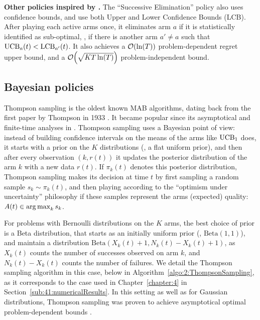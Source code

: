 \textbf{Other policies inspired by \UCB.}
%
The ``Successive Elimination'' policy also uses confidence bounds, and use both Upper and Lower Confidence Bounds (LCB).
After playing each active arms once, it eliminates arm $a$ if it is statistically identified as sub-optimal, \ie, if there is another arm $a' \neq a$ such that $\mathrm{UCB}_a(t) < \mathrm{LCB}_{a'}(t)$.
It also achieves a $\mathop{}\mathopen{}\mathcal{O}\mathopen{}\left(\ln(T)\right)$ problem-dependent regret upper bound, and a $\mathop{}\mathopen{}\mathcal{O}\mathopen{}\left(\sqrt{K T \ln(T)}\right)$ problem-independent bound.


\subsection{Bayesian policies}



Thompson sampling is the oldest known MAB algorithms, dating back from the first paper by Thompson in 1933 \cite{Thompson33}.
It became popular since its asymptotical and finite-time analyses in \cite{AgrawalGoyal11,Kaufmann12Thompson}.
%
Thompson sampling uses a Bayesian point of view:
instead of building confidence intervals on the means of the arms like $\mathrm{UCB}_1$ does,
it starts with a prior on the $K$ distributions (\eg, a flat uniform prior), and then after every observation $(k, r(t))$ it updates the posterior distribution of the arm $k$ with a new data $r(t)$.
If $\pi_k(t)$ denotes this posterior distribution, Thompson sampling makes its decision at time $t$ by first sampling a random sample $s_k \sim \pi_k(t)$, and then playing according to the ``optimism under uncertainty'' philosophy if these samples represent the arms (expected) quality: $A(t) \in \operatorname*{arg\,max}_k s_k$.

For problems with Bernoulli distributions on the $K$ arms,
the best choice of prior is a Beta distribution, that starts as an initially uniform prior (\ie, $\mathrm{Beta}(1,1)$),
and maintain a distribution $\mathrm{Beta}(X_k(t)+1,N_k(t)-X_k(t)+1)$,
as $X_k(t)$ counts the number of successes observed on arm $k$, and $N_k(t)-X_k(t)$ counts the number of failures.
%
We detail the Thompson sampling algorithm in this case, below in Algorithm~\ref{algo:2:ThompsonSampling}, as it corresponds to the case used in Chapter~\ref{chapter:4} in Section~\ref{sub:41:numericalResults}.
%
In this setting as well as for Gaussian distributions,
Thompson sampling was proven to achieve asymptotical optimal problem-dependent bounds \cite{Kaufmann12Thompson,AgrawalGoyal11}.


